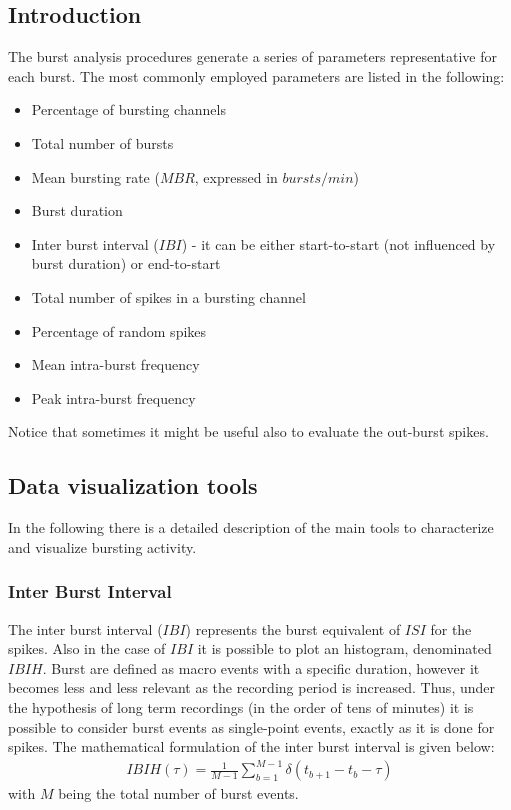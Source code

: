 \subsection{Introduction}
The burst analysis procedures generate a series of parameters representative for
each burst. The most commonly employed parameters are listed in the following:
\begin{itemize}
    \item Percentage of bursting channels
    \item Total number of bursts
    \item Mean bursting rate (\(MBR\), expressed in \(bursts/min\))
    \item Burst duration
    \item Inter burst interval (\(IBI\)) - it can be either start-to-start (not
    influenced by burst duration) or end-to-start
    \item Total number of spikes in a bursting channel
    \item Percentage of random spikes
    \item Mean intra-burst frequency
    \item Peak intra-burst frequency
\end{itemize}
Notice that sometimes it might be useful also to evaluate the out-burst spikes.

\subsection{Data visualization tools}
In the following there is a detailed description of the main tools to characterize and
visualize bursting activity.

\subsubsection{Inter Burst Interval}
The inter burst interval (\(IBI\)) represents the burst equivalent of \(ISI\) for
the spikes. Also in the case of \(IBI\) it is possible to plot an histogram,
denominated \(IBIH\). Burst are defined as macro events with a specific duration,
however it becomes less and less relevant as the recording period is increased.
Thus, under the hypothesis of long term recordings (in the order of tens of minutes)
it is possible to consider burst events as single-point events, exactly as it is done
for spikes. The mathematical formulation of the inter burst interval is given below:
\begin{align*}
    IBIH(\tau)=\frac{1}{M-1}\sum_{b=1}^{M-1}\delta(t_{b+1}-t_{b}-\tau)
\end{align*}
with \(M\) being the total number of burst events.
